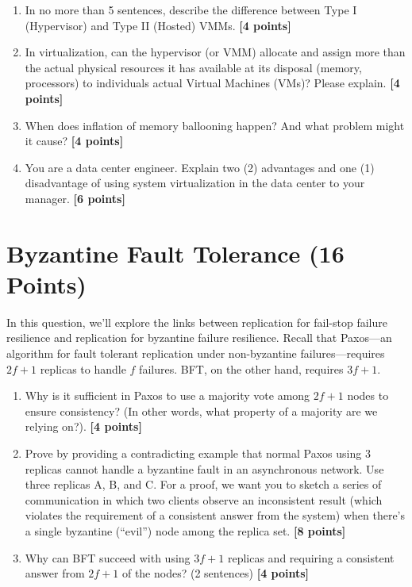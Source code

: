 \documentclass{article}
\begin{document}
\begin{enumerate}
\item In no more than 5 sentences, describe the difference between Type I (Hypervisor) and Type II (Hosted) VMMs. \textbf{[4 points]}


\item In virtualization, can the hypervisor (or VMM) allocate and assign more than the actual physical resources it has available at its disposal (memory, processors) to individuals actual Virtual Machines (VMs)? Please explain. \textbf{[4 points]}


\item When does inflation of memory ballooning happen? And what problem might it cause? \textbf{[4 points]}


\item You are a data center engineer. Explain two (2) advantages and one (1) disadvantage of using system virtualization in the data center to your manager. \textbf{[6 points]}

\end{enumerate}

\section{Byzantine Fault Tolerance (16 Points)}
In this question, we'll explore the links between replication for fail-stop failure resilience and replication for byzantine failure resilience.  Recall that Paxos---an algorithm for fault tolerant replication under non-byzantine failures---requires $2f+1$ replicas to handle $f$ failures.  BFT, on the other hand, requires $3f+1$.
\begin{enumerate}
\item Why is it sufficient in Paxos to use a majority vote among $2f+1$ nodes to ensure consistency?  (In other words, what property of a majority are we relying on?). \textbf{[4 points]}


\item Prove by providing a contradicting example that normal Paxos using 3 replicas cannot handle a byzantine fault in an asynchronous network.  Use three replicas A, B, and C.  For a proof, we want you to sketch a series of communication in which two clients observe an inconsistent result (which violates the requirement of a consistent answer from the system) when there's a single byzantine (``evil'') node among the replica set. \textbf{[8 points]}


\item Why can BFT succeed with using $3f+1$ replicas and requiring a consistent answer from $2f+1$ of the nodes?  (2 sentences) \textbf{[4 points]}


\end{enumerate}
\end{document}
